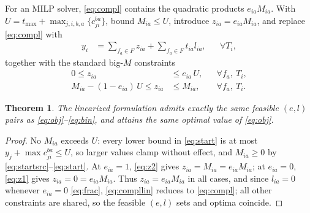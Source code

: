 \documentclass[conference]{IEEEtran}
\newtheorem{theorem}{Theorem}
\begin{document}
For an MILP solver, \eqref{eq:compl} contains the quadratic products
$e_{ia}M_{ia}$. With $U=t_{\max}+\max_{j,i,b,a}\{c_{ji}^{ba}\}$,
bound $M_{ia}\le U$, introduce $z_{ia}=e_{ia}M_{ia}$, and replace \eqref{eq:compl} with
\begin{align}
y_i&=\sum_{f_a\in F} z_{ia}+\sum_{f_a\in F} t_{ia}l_{ia}, && \forall T_i, \label{eq:compllin}
\end{align}
together with the standard big-$M$ constraints
\begin{align}
0 \le z_{ia} &\le e_{ia} \, U, && \forall f_a,\ T_i, \label{eq:z1} \\
M_{ia}-(1-e_{ia})\,U \le z_{ia} &\le M_{ia}, && \forall f_a,\ T_i. \label{eq:z2}
\end{align}

\begin{theorem}
\label{thm:lin}
The linearized formulation admits exactly the same feasible $(e,l)$
pairs as \eqref{eq:obj}--\eqref{eq:bin}, and attains the same optimal
value of \eqref{eq:obj}.
\end{theorem}
\begin{proof}
No $M_{ia}$ exceeds $U$: every lower bound in \eqref{eq:start} is at
most $y_j+\max c_{ji}^{ba}\le U$, so larger values clamp without effect,
and $M_{ia}\ge 0$ by \eqref{eq:startsrc}--\eqref{eq:start}. At
$e_{ia}=1$, \eqref{eq:z2} gives $z_{ia}=M_{ia}=e_{ia}M_{ia}$; at
$e_{ia}=0$, \eqref{eq:z1} gives $z_{ia}=0=e_{ia}M_{ia}$. Thus
$z_{ia}=e_{ia}M_{ia}$ in all cases, and since $l_{ia}=0$ whenever
$e_{ia}=0$ \eqref{eq:frac}, \eqref{eq:compllin} reduces to
\eqref{eq:compl}; all other constraints are shared, so the feasible
$(e,l)$ sets and optima coincide.
\end{proof}

\enlargethispage{12\baselineskip}
\vspace*{-0.8em}
{\fontsize{6.0}{7.0}\selectfont

}
\end{document}
